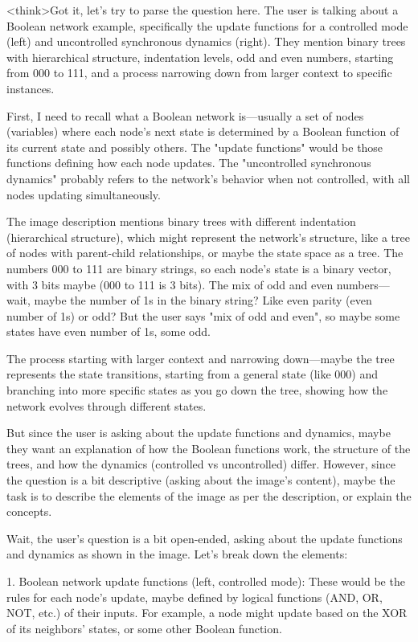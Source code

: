 <think>Got it, let's try to parse the question here. The user is talking about a Boolean network example, specifically the update functions for a controlled mode (left) and uncontrolled synchronous dynamics (right). They mention binary trees with hierarchical structure, indentation levels, odd and even numbers, starting from 000 to 111, and a process narrowing down from larger context to specific instances.

First, I need to recall what a Boolean network is—usually a set of nodes (variables) where each node's next state is determined by a Boolean function of its current state and possibly others. The "update functions" would be those functions defining how each node updates. The "uncontrolled synchronous dynamics" probably refers to the network's behavior when not controlled, with all nodes updating simultaneously.

The image description mentions binary trees with different indentation (hierarchical structure), which might represent the network's structure, like a tree of nodes with parent-child relationships, or maybe the state space as a tree. The numbers 000 to 111 are binary strings, so each node's state is a binary vector, with 3 bits maybe (000 to 111 is 3 bits). The mix of odd and even numbers—wait, maybe the number of 1s in the binary string? Like even parity (even number of 1s) or odd? But the user says "mix of odd and even", so maybe some states have even number of 1s, some odd.

The process starting with larger context and narrowing down—maybe the tree represents the state transitions, starting from a general state (like 000) and branching into more specific states as you go down the tree, showing how the network evolves through different states.

But since the user is asking about the update functions and dynamics, maybe they want an explanation of how the Boolean functions work, the structure of the trees, and how the dynamics (controlled vs uncontrolled) differ. However, since the question is a bit descriptive (asking about the image's content), maybe the task is to describe the elements of the image as per the description, or explain the concepts.

Wait, the user's question is a bit open-ended, asking about the update functions and dynamics as shown in the image. Let's break down the elements:

1. Boolean network update functions (left, controlled mode): These would be the rules for each node's update, maybe defined by logical functions (AND, OR, NOT, etc.) of their inputs. For example, a node might update based on the XOR of its neighbors' states, or some other Boolean function.


